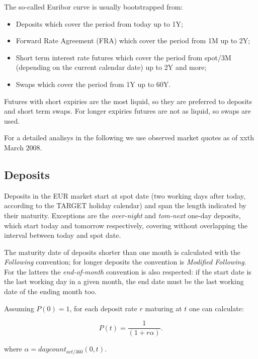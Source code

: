 \documentclass[11pt,reqno]{amsart}
\begin{document}
The so-called Euribor curve is usually bootstrapped from:

\begin{itemize}
\item Deposits which cover the period from today up to 1Y;

\item Forward Rate Agreement (FRA) which cover the period from 1M up to 2Y;

\item Short term interest rate futures which cover the period from spot/3M (depending on
the current calendar date) up to 2Y and more;

\item Swaps which cover the period from 1Y up to 60Y.
\end{itemize}

Futures with short expiries are the most liquid, so they are preferred to
deposits and short term swaps. For longer expiries futures are not as liquid, so
swaps are used.

For a detailed analisys in the following we use observed market quotes as of
xxth March 2008.

\subsection{Deposits}

Deposits in the EUR market start at spot date (two working days after today,
according to the TARGET holiday calendar) and span the length indicated by their maturity.
Exceptions are the {\it over-night} and {\it tom-next} one-day deposits, which start today and
tomorrow respectively, covering without overlapping the interval between today and spot date.

The maturity date of deposits shorter than one month is calculated with the
{\it Following} convention; for longer deposits the convention
is {\it Modified Following}. For the latters the {\it end-of-month} convention
is also respected: if the start date is the last working day in a given month,
the end date must be the last working date of the ending month too.

Assuming $P(0)=1$, for each deposit rate $r$ maturing at $t$ one can calculate:

\begin{equation}
P(t) = \frac{1}{(1 + r \alpha)}.
\label{eqn:deposit}
\end{equation}

where $\alpha = daycount_{act/360}(0,t)$.
\end{document}
